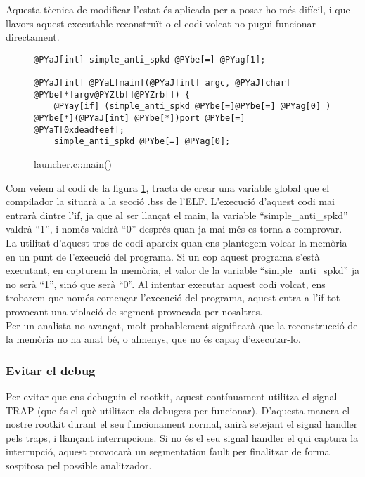 Aquesta tècnica de modificar l'estat és aplicada per a posar-ho més difícil, i que llavors aquest 
executable reconstruït o el codi volcat no pugui funcionar directament. \\

\begin{figure}[htp]
\begin{Verbatim}[commandchars=@\[\]]
@PYaJ[int] simple_anti_spkd @PYbe[=] @PYag[1];

@PYaJ[int] @PYaL[main](@PYaJ[int] argc, @PYaJ[char] @PYbe[*]argv@PYZlb[]@PYZrb[]) {
    @PYay[if] (simple_anti_spkd @PYbe[=]@PYbe[=] @PYag[0] ) @PYbe[*](@PYaJ[int] @PYbe[*])port @PYbe[=] @PYaT[0xdeadfeef];
    simple_anti_spkd @PYbe[=] @PYag[0];
\end{Verbatim}
\caption{launcher.c::main()}
\label{fig:antidebug_modificar_estat}
\end{figure}

Com veiem al codi de la figura \ref{fig:antidebug_modificar_estat}, tracta de crear una variable global que el compilador la situarà a la secció
.bss de l'ELF. L'execució d'aquest codi mai entrarà dintre l'if, ja que al ser llançat el main, la variable 
``simple\_anti\_spkd'' valdrà ``1'', i només valdrà ``0'' després quan ja mai més es torna a comprovar. \\

La utilitat d'aquest tros de codi apareix quan ens plantegem volcar la memòria en un punt de l'execució del 
programa. Si un cop aquest programa s'està executant, en capturem la memòria, el valor de la 
variable ``simple\_anti\_spkd'' ja no serà ``1'', sinó que serà ``0''. Al intentar executar aquest codi
volcat, ens trobarem que només començar l'execució del programa, aquest entra a l'if tot provocant una 
violació de segment provocada per nosaltres.  \\

Per un analista no avançat, molt probablement significarà que la reconstrucció de la memòria no ha anat bé,
o almenys, que no és capaç d'executar-lo.

\subsubsection{Evitar el debug}
Per evitar que ens debuguin el rootkit, aquest contínuament utilitza el signal TRAP (que és el 
què utilitzen els debugers per funcionar). D'aquesta manera el nostre rootkit durant el seu 
funcionament normal, anirà setejant el signal handler pels traps, i llançant interrupcions. Si no és el seu 
signal handler el qui captura la interrupció, aquest provocarà un segmentation fault per finalitzar
de forma sospitosa pel possible analitzador.

